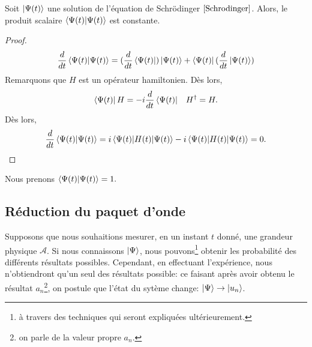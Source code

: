 \documentclass[../notesdecours.tex]{subfiles}
\begin{document}
\begin{Property} Soit $\ket{\Psi(t)}$ une solution de l'équation de Schrödinger $\eqref{Schrodinger}$. Alors, le produit scalaire $\braket{\Psi(t)|\Psi(t)}$ est constante. \end{Property}
\begin{proof}
\begin{equation}
\frac{d}{dt} \braket{\Psi(t)|\Psi(t)} = (\frac{d}{dt}\bra{\Psi(t)})\ket{\Psi(t)} + \bra{\Psi(t)}(\frac{d}{dt}\ket{\Psi(t)})
\end{equation}
Remarquons que $H$ est un opérateur hamiltonien. Dès lors,
\begin{align}
\bra{\Psi(t)}H &= -i\frac{d}{dt}\bra{\Psi(t)}		&H^\dag = H.
\end{align}
Dès lors,
\begin{align}
\frac{d}{dt} \braket{\Psi(t)|\Psi(t)} = i \braket{\Psi(t) | H(t) | \Psi(t)} - i \braket{\Psi(t)|H(t)|\Psi(t)} = 0.
\end{align}
\end{proof}

\begin{remark} Nous prenons $\braket{\Psi(t)|\Psi(t)} = 1.$ \end{remark}

\subsection{Réduction du paquet d'onde}
Supposons que nous souhaitions mesurer, en un instant $t$ donné, une grandeur physique $\mathcal{A}$. Si nous connaissons $\ket{\Psi}$, nous pouvons\footnote{à travers des techniques qui seront expliquées ultérieurement.} obtenir les probabilité des différents résultats possibles. Cependant, en effectuant l'expérience, nous n'obtiendront qu'un seul des résultats possible: ce faisant après avoir obtenu le résultat $a_n$\footnote{on parle de la valeur propre $a_n$.}, on postule que l'état du sytème change: $\ket{\Psi} \to \ket{u_n}$.

\begin{center}
\end{center}
\end{document}
